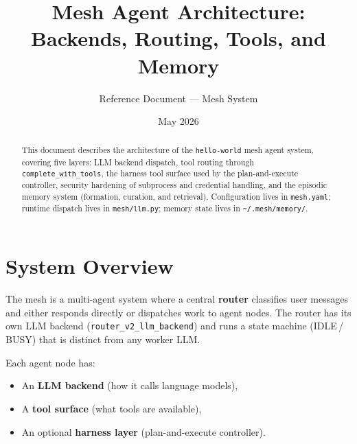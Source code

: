 \documentclass[11pt,a4paper]{article}
\title{Mesh Agent Architecture:\\Backends, Routing, Tools, and Memory}
\author{Reference Document --- \code{hello-world} Mesh System}
\date{May 2026}
\newcommand{\code}[1]{\texttt{#1}}
\begin{document}
\maketitle

\begin{abstract}
This document describes the architecture of the \code{hello-world} mesh
agent system, covering five layers: LLM backend dispatch, tool routing
through \code{complete\_with\_tools}, the harness tool surface used by
the plan-and-execute controller, security hardening of subprocess and
credential handling, and the episodic memory system (formation,
curation, and retrieval). Configuration lives in \code{mesh.yaml};
runtime dispatch lives in \code{mesh/llm.py}; memory state lives in
\code{\textasciitilde/.mesh/memory/}.
\end{abstract}

\tableofcontents
\newpage

\section{System Overview}

The mesh is a multi-agent system where a central \textbf{router}
classifies user messages and either responds directly or dispatches work
to agent nodes.  The router has its own LLM backend
(\code{router\_v2\_llm\_backend}) and runs a state machine
(IDLE\,/\,BUSY) that is distinct from any worker LLM.

Each agent node has:
\begin{itemize}[nosep]
  \item An \textbf{LLM backend} (how it calls language models),
  \item A \textbf{tool surface} (what tools are available),
  \item An optional \textbf{harness layer} (plan-and-execute controller).
\end{itemize}
\end{document}
